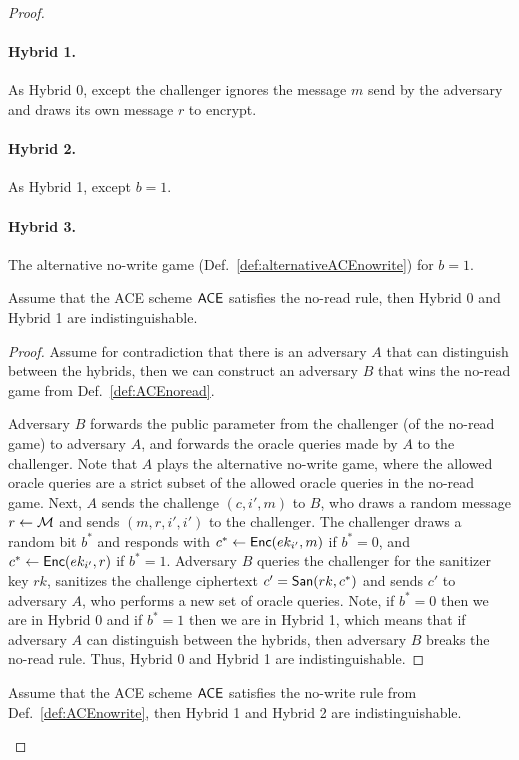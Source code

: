 \documentclass{llncs}
\begin{document}
\begin{proof}
\paragraph{Hybrid 1.} As Hybrid 0, except the challenger ignores the message $m$ send by the adversary and draws its own message $r$ to encrypt.

\paragraph{Hybrid 2.} As Hybrid 1, except $b=1$.

\paragraph{Hybrid 3.} The alternative no-write game (Def.~\ref{def:alternativeACEnowrite}) for $b=1$.

\begin{claim}
Assume that the ACE scheme $\mathsf{ACE}$ satisfies the no-read rule, then Hybrid 0 and Hybrid 1 are indistinguishable.
\end{claim}

\begin{proof}
Assume for contradiction that there is an adversary $A$ that can distinguish between the hybrids, then we can construct an adversary $B$ that wins the no-read game from Def.~\ref{def:ACEnoread}.

Adversary $B$ forwards the public parameter from the challenger (of the no-read game) to adversary $A$, and forwards the oracle queries made by $A$ to the challenger. Note that $A$ plays the alternative no-write game, where the allowed oracle queries are a strict subset of the allowed oracle queries in the no-read game. 
Next, $A$ sends the challenge $(c,i',m)$ to $B$, who draws a random message $r \leftarrow \mathcal{M}$ and sends $(m,r,i',i')$ to the challenger. 
The challenger draws a random bit $b^*$ and responds with $c^* \leftarrow \mathsf{Enc}(ek_{i'},m)$ if $b^*=0$, and $c^* \leftarrow \mathsf{Enc}(ek_{i'},r)$ if $b^*=1$. 
Adversary $B$ queries the challenger for the sanitizer key $rk$, sanitizes the challenge ciphertext $c' = \mathsf{San}(rk,c^*)$ and sends $c'$ to adversary $A$, who performs a new set of oracle queries. 
Note, if $b^*=0$ then we are in Hybrid 0 and if $b^*=1$ then we are in Hybrid 1, which means that if adversary $A$ can distinguish between the hybrids, then adversary $B$ breaks the no-read rule. Thus, Hybrid 0 and Hybrid 1 are indistinguishable.
\end{proof}

\begin{claim}
Assume that the ACE scheme $\mathsf{ACE}$ satisfies the no-write rule from Def.~\ref{def:ACEnowrite}, then Hybrid 1 and Hybrid 2 are indistinguishable.
\end{claim}


\end{proof}
\end{document}
